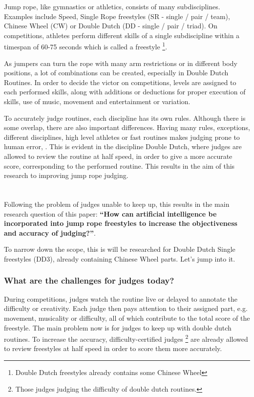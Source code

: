 Jump rope, like gymnastics or athletics, consists of many subdisciplines. Examples include Speed, Single Rope freestyles (SR - single / pair / team), Chinese Wheel (CW) or Double Dutch (DD - single / pair / triad). On competitions, athletes perform different skills of a single subdiscipline within a timespan of 60-75 seconds which is called a freestyle \footnote{Double Dutch freestyles already contains some Chinese Wheel}.

As jumpers can turn the rope with many arm restrictions or in different body positions, a lot of combinations can be created, especially in Double Dutch Routines. In order to decide the victor on competitions, levels are assigned to each performed skills, along with additions or deductions for proper execution of skills, use of music, movement and entertainment or variation.

To accurately judge routines, each discipline has its own rules. Although there is some overlap, there are also important differences.
Having many rules, exceptions, different disciplines, high level athletes or fast routines makes judging prone to human error, \autocite{Heiniger2018}. This is evident in the discipline Double Dutch, where judges are allowed to review the routine at half speed, in order to give a more accurate score, corresponding to the performed routine. This results in the aim of this research to improving jump rope judging.

\section{}%
\label{sec:onderzoeksvraag}

Following the problem of judges unable to keep up, this results in the main research question of this paper: \textbf{``How can artificial intelligence be incorporated into jump rope freestyles to increase the objectiveness and accuracy of judging?''}.

To narrow down the scope, this is will be researched for Double Dutch Single freestyles (DD3), already containing Chinese Wheel parts. Let's jump into it.

\subsubsection{What are the challenges for judges today?}
\label{subsubsec:intro-bp-question-challenges-for-judges}

During competitions, judges watch the routine live or delayed to annotate the difficulty or creativity. Each judge then pays attention to their assigned part, e.g. movement, musicality or difficulty, all of which contribute to the total score of the freestyle. The main problem now is for judges to keep up with double dutch routines. To increase the accuracy, difficulty-certified judges \footnote{Those judges judging the difficulty of double dutch routines.} are already allowed to review freestyles at half speed in order to score them more accurately.

